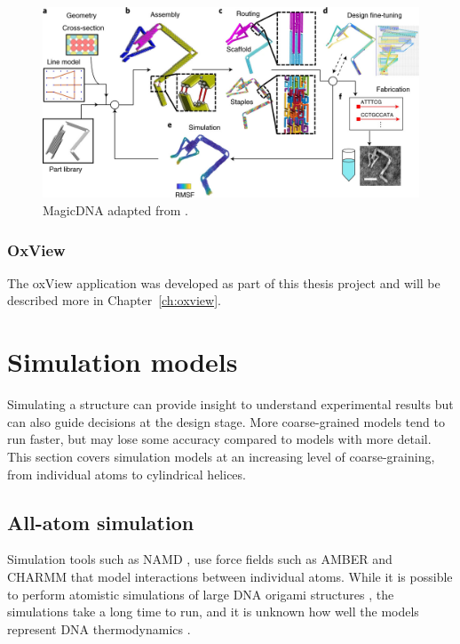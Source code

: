 \begin{figure}[h]
  \begin{center}
    \includegraphics[width=\textwidth]{figures/magicDNA.jpeg}
    \caption{MagicDNA adapted from \cite{huang2021integrated}.}
    \label{fig:magicDNA}
  \end{center}
\end{figure}

\subsubsection{OxView}
The oxView application was developed as part of this thesis project and will be described more in Chapter~\ref{ch:oxview}.

\section{Simulation models}
Simulating a structure can provide insight to understand experimental results but can also guide decisions at the design stage. More coarse-grained models tend to run faster, but may lose some accuracy compared to models with more detail. This section covers simulation models at an increasing level of coarse-graining, from individual atoms to cylindrical helices.

\subsection{All-atom simulation}
Simulation tools such as NAMD \cite{NAMDphillips2005scalable}, use force fields such as AMBER \cite{AMBERcornell1996second} and CHARMM \cite{brooks1983charmm} that model interactions between individual atoms. While it is possible to perform atomistic simulations of large DNA origami structures \cite{yoo2013situ}, the simulations take a long time to run, and it is unknown how well the models represent DNA thermodynamics \cite{sengar2021primer}.


